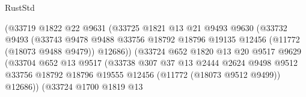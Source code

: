 \begin{lexlean}{RustStd}
\begin{coremodule}
                                    (@33719
                                      @1822
                                      @22
                                      @9631
                                      (@33725
                                        @1821
                                        @13
                                        @21
                                        @9493
                                        @9630
                                        (@33732
                                          @9493
                                          (@33743
                                            @9478
                                            @9488
                                            @33756
                                            @18792
                                            @18796
                                            @19135
                                            @12456
                                            (@11772 (@18073 @9488 @9479))
                                            @12686))
                                        (@33724
                                          @652
                                          @1820
                                          @13
                                          @20
                                          @9517
                                          @9629
                                          (@33704
                                            @652
                                            @13
                                            @9517
                                            (@33738
                                              @307
                                              @37
                                              @13
                                              @2444
                                              @2624
                                              @9498
                                              @9512
                                              @33756
                                              @18792
                                              @18796
                                              @19555
                                              @12456
                                              (@11772 (@18073 @9512 @9499))
                                              @12686))
                                          (@33724
                                            @1700
                                            @1819
                                            @13

\end{coremodule}
\end{lexlean}
